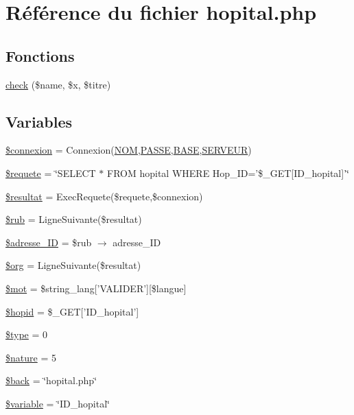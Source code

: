 \hypertarget{hopital_8php}{
\section{R\'{e}f\'{e}rence du fichier hopital.php}
\label{hopital_8php}
}
\subsection*{Fonctions}
\begin{CompactItemize}
\item 
\hyperlink{hopital_8php_a12}{check} (\$name, \$x, \$titre)
\end{CompactItemize}
\subsection*{Variables}
\begin{CompactItemize}
\item 
\hyperlink{hopital_8php_a0}{\$connexion} = Connexion(\hyperlink{pma__connect_8php_a0}{NOM},\hyperlink{pma__connect_8php_a1}{PASSE},\hyperlink{pma__connect_8php_a3}{BASE},\hyperlink{pma__connect_8php_a2}{SERVEUR})
\item 
\hyperlink{hopital_8php_a1}{\$requete} = \char`\"{}SELECT $\ast$ FROM hopital WHERE Hop\_\-ID='\$\_\-GET\mbox{[}ID\_\-hopital\mbox{]}'\char`\"{}
\item 
\hyperlink{hopital_8php_a2}{\$resultat} = Exec\-Requete(\$requete,\$connexion)
\item 
\hyperlink{hopital_8php_a3}{\$rub} = Ligne\-Suivante(\$resultat)
\item 
\hyperlink{hopital_8php_a4}{\$adresse\_\-ID} = \$rub $\rightarrow$ adresse\_\-ID
\item 
\hyperlink{hopital_8php_a5}{\$org} = Ligne\-Suivante(\$resultat)
\item 
\hyperlink{hopital_8php_a6}{\$mot} = \$string\_\-lang\mbox{[}'VALIDER'\mbox{]}\mbox{[}\$langue\mbox{]}
\item 
\hyperlink{hopital_8php_a7}{\$hopid} = \$\_\-GET\mbox{[}'ID\_\-hopital'\mbox{]}
\item 
\hyperlink{hopital_8php_a8}{\$type} = 0
\item 
\hyperlink{hopital_8php_a9}{\$nature} = 5
\item 
\hyperlink{hopital_8php_a10}{\$back} = \char`\"{}hopital.php\char`\"{}
\item 
\hyperlink{hopital_8php_a11}{\$variable} = \char`\"{}ID\_\-hopital\char`\"{}
\end{CompactItemize}


